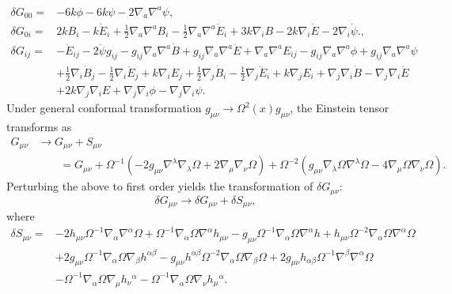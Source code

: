 \documentclass[10pt,letterpaper]{article}
\begin{document}
\begin{align}
\delta G_{00}={}&-6 k \phi
 - 6 k \psi
 - 2 \nabla_{a}\nabla^{a}\psi,
\\
\delta G_{0i}={}&2 k B_{i}
 -  k \dot{E}_{i}
 + \tfrac{1}{2} \nabla_{a}\nabla^{a}B_{i}
 -  \tfrac{1}{2} \nabla_{a}\nabla^{a}\dot{E}_{i}
 + 3 k \nabla_{i}B
 - 2 k \nabla_{i}\dot{E}
 - 2 \nabla_{i}\dot{\psi}.,
\\
\delta G_{ij}={}&- \ddot{E}_{ij}
 - 2 \ddot{\psi} g_{ij}
 -  g_{ij} \nabla_{a}\nabla^{a}\dot{B}
 + g_{ij} \nabla_{a}\nabla^{a}\ddot{E}
 + \nabla_{a}\nabla^{a}E_{ij}
 -  g_{ij} \nabla_{a}\nabla^{a}\phi
 + g_{ij} \nabla_{a}\nabla^{a}\psi\nonumber\\
& + \tfrac{1}{2} \nabla_{i}\dot{B}_{j}
 -  \tfrac{1}{2} \nabla_{i}\ddot{E}_{j}
 + k \nabla_{i}E_{j}
 + \tfrac{1}{2} \nabla_{j}\dot{B}_{i}
 -  \tfrac{1}{2} \nabla_{j}\ddot{E}_{i}
 + k \nabla_{j}E_{i}
 + \nabla_{j}\nabla_{i}\dot{B}
 -  \nabla_{j}\nabla_{i}\ddot{E}\nonumber\\
& + 2 k \nabla_{j}\nabla_{i}E
 + \nabla_{j}\nabla_{i}\phi
 -  \nabla_{j}\nabla_{i}\psi.
\end{align}
Under general conformal transformation $g_{\mu\nu}\to \Omega^2(x)g_{\mu\nu}$, the  Einstein tensor transforms as
\begin{align}
G_{\mu\nu} &\to G_{\mu\nu} + S_{\mu\nu}
\nonumber\\
&\qquad= G_{\mu\nu} +
\Omega^{-1}\left( -2g_{\mu\nu}\nabla^\lambda \nabla_\lambda \Omega + 2\nabla_\mu \nabla_\nu \Omega\right) +
\Omega^{-2}\left( g_{\mu\nu} \nabla_\lambda \Omega \nabla^\lambda \Omega - 4 \nabla_\mu \Omega \nabla_\nu \Omega\right).
\end{align}
Perturbing the above to first order yields the transformation of $\delta G_{\mu\nu}$:
\begin{equation}
\delta G_{\mu\nu} \to \delta G_{\mu\nu} + \delta S_{\mu\nu},
\end{equation}
where
\begin{align}
\delta S_{\mu\nu}={}&-2 h_{\mu \nu} \Omega^{-1} \nabla_{\alpha}\nabla^{\alpha}\Omega
 + \Omega^{-1} \nabla_{\alpha}\Omega \nabla^{\alpha}h_{\mu \nu}
 -  g_{\mu \nu} \Omega^{-1} \nabla_{\alpha}\Omega \nabla^{\alpha}h
 + h_{\mu \nu} \Omega^{-2} \nabla_{\alpha}\Omega \nabla^{\alpha}\Omega\nonumber\\
& + 2 g_{\mu \nu} \Omega^{-1} \nabla_{\alpha}\Omega \nabla_{\beta}h^{\alpha \beta}
 -  g_{\mu \nu} h^{\alpha \beta} \Omega^{-2} \nabla_{\alpha}\Omega \nabla_{\beta}\Omega
 + 2 g_{\mu \nu} h_{\alpha \beta} \Omega^{-1} \nabla^{\beta}\nabla^{\alpha}\Omega\nonumber\\
& -  \Omega^{-1} \nabla_{\alpha}\Omega \nabla_{\mu}h_{\nu}{}^{\alpha}
 -  \Omega^{-1} \nabla_{\alpha}\Omega \nabla_{\nu}h_{\mu}{}^{\alpha}.
\end{align}
\end{document}
